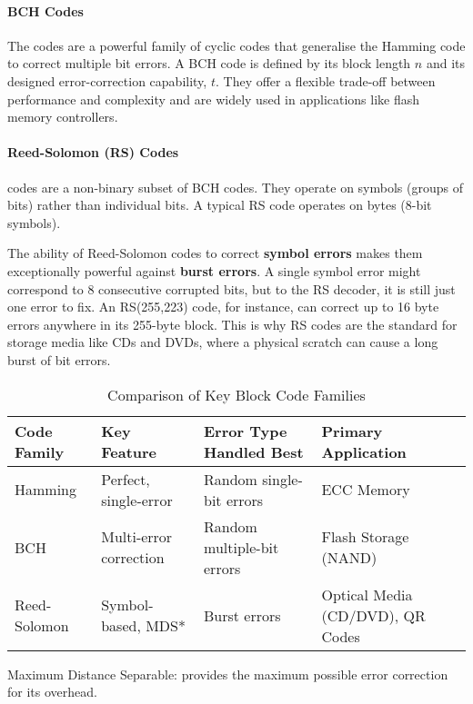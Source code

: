 \paragraph{BCH Codes}
The  codes are a powerful family of cyclic codes that generalise the Hamming code to correct multiple bit errors. A BCH code is defined by its block length $n$ and its designed error-correction capability, $t$. They offer a flexible trade-off between performance and complexity and are widely used in applications like flash memory controllers.

\paragraph{Reed-Solomon (RS) Codes}
 codes are a non-binary subset of BCH codes. They operate on symbols (groups of bits) rather than individual bits. A typical RS code operates on bytes (8-bit symbols).
\begin{warningbox}
    The ability of Reed-Solomon codes to correct \textbf{symbol errors} makes them exceptionally powerful against \textbf{burst errors}. A single symbol error might correspond to 8 consecutive corrupted bits, but to the RS decoder, it is still just one error to fix. An RS(255,223) code, for instance, can correct up to 16 byte errors anywhere in its 255-byte block. This is why RS codes are the standard for storage media like CDs and DVDs, where a physical scratch can cause a long burst of bit errors.
\end{warningbox}

\begin{table}[H]
    \centering
    \caption{Comparison of Key Block Code Families}
    \label{tab:block-code-summary}
    \begin{tabularx}{\textwidth}{@{}lXXX@{}}
        \toprule
        \tableheaderfont Code Family & \tableheaderfont Key Feature & \tableheaderfont Error Type Handled Best & \tableheaderfont Primary Application \\
        \midrule
        Hamming & Perfect, single-error & Random single-bit errors & ECC Memory \\
        BCH & Multi-error correction & Random multiple-bit errors & Flash Storage (NAND) \\
        Reed-Solomon & Symbol-based, MDS* & Burst errors & Optical Media (CD/DVD), QR Codes \\
        \bottomrule
    \end{tabularx}
    \par\vspace{0.5em}
    \small *Maximum Distance Separable: provides the maximum possible error correction for its overhead.
\end{table}


